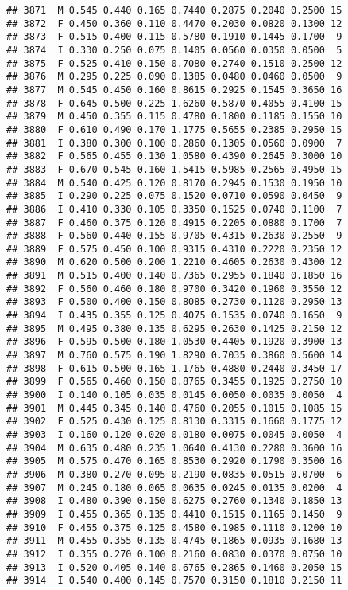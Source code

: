 \documentclass[
]{article}
\begin{document}
\begin{verbatim}
## 3871  M 0.545 0.440 0.165 0.7440 0.2875 0.2040 0.2500 15
## 3872  F 0.450 0.360 0.110 0.4470 0.2030 0.0820 0.1300 12
## 3873  F 0.515 0.400 0.115 0.5780 0.1910 0.1445 0.1700  9
## 3874  I 0.330 0.250 0.075 0.1405 0.0560 0.0350 0.0500  5
## 3875  F 0.525 0.410 0.150 0.7080 0.2740 0.1510 0.2500 12
## 3876  M 0.295 0.225 0.090 0.1385 0.0480 0.0460 0.0500  9
## 3877  M 0.545 0.450 0.160 0.8615 0.2925 0.1545 0.3650 16
## 3878  F 0.645 0.500 0.225 1.6260 0.5870 0.4055 0.4100 15
## 3879  M 0.450 0.355 0.115 0.4780 0.1800 0.1185 0.1550 10
## 3880  F 0.610 0.490 0.170 1.1775 0.5655 0.2385 0.2950 15
## 3881  I 0.380 0.300 0.100 0.2860 0.1305 0.0560 0.0900  7
## 3882  F 0.565 0.455 0.130 1.0580 0.4390 0.2645 0.3000 10
## 3883  F 0.670 0.545 0.160 1.5415 0.5985 0.2565 0.4950 15
## 3884  M 0.540 0.425 0.120 0.8170 0.2945 0.1530 0.1950 10
## 3885  I 0.290 0.225 0.075 0.1520 0.0710 0.0590 0.0450  9
## 3886  I 0.410 0.330 0.105 0.3350 0.1525 0.0740 0.1100  7
## 3887  F 0.460 0.375 0.120 0.4915 0.2205 0.0880 0.1700  7
## 3888  F 0.560 0.440 0.155 0.9705 0.4315 0.2630 0.2550  9
## 3889  F 0.575 0.450 0.100 0.9315 0.4310 0.2220 0.2350 12
## 3890  M 0.620 0.500 0.200 1.2210 0.4605 0.2630 0.4300 12
## 3891  M 0.515 0.400 0.140 0.7365 0.2955 0.1840 0.1850 16
## 3892  F 0.560 0.460 0.180 0.9700 0.3420 0.1960 0.3550 12
## 3893  F 0.500 0.400 0.150 0.8085 0.2730 0.1120 0.2950 13
## 3894  I 0.435 0.355 0.125 0.4075 0.1535 0.0740 0.1650  9
## 3895  M 0.495 0.380 0.135 0.6295 0.2630 0.1425 0.2150 12
## 3896  F 0.595 0.500 0.180 1.0530 0.4405 0.1920 0.3900 13
## 3897  M 0.760 0.575 0.190 1.8290 0.7035 0.3860 0.5600 14
## 3898  F 0.615 0.500 0.165 1.1765 0.4880 0.2440 0.3450 17
## 3899  F 0.565 0.460 0.150 0.8765 0.3455 0.1925 0.2750 10
## 3900  I 0.140 0.105 0.035 0.0145 0.0050 0.0035 0.0050  4
## 3901  M 0.445 0.345 0.140 0.4760 0.2055 0.1015 0.1085 15
## 3902  F 0.525 0.430 0.125 0.8130 0.3315 0.1660 0.1775 12
## 3903  I 0.160 0.120 0.020 0.0180 0.0075 0.0045 0.0050  4
## 3904  M 0.635 0.480 0.235 1.0640 0.4130 0.2280 0.3600 16
## 3905  M 0.575 0.470 0.165 0.8530 0.2920 0.1790 0.3500 16
## 3906  M 0.380 0.270 0.095 0.2190 0.0835 0.0515 0.0700  6
## 3907  M 0.245 0.180 0.065 0.0635 0.0245 0.0135 0.0200  4
## 3908  I 0.480 0.390 0.150 0.6275 0.2760 0.1340 0.1850 13
## 3909  I 0.455 0.365 0.135 0.4410 0.1515 0.1165 0.1450  9
## 3910  F 0.455 0.375 0.125 0.4580 0.1985 0.1110 0.1200 10
## 3911  M 0.455 0.355 0.135 0.4745 0.1865 0.0935 0.1680 13
## 3912  I 0.355 0.270 0.100 0.2160 0.0830 0.0370 0.0750 10
## 3913  I 0.520 0.405 0.140 0.6765 0.2865 0.1460 0.2050 15
## 3914  I 0.540 0.400 0.145 0.7570 0.3150 0.1810 0.2150 11

\end{verbatim}
\end{document}
